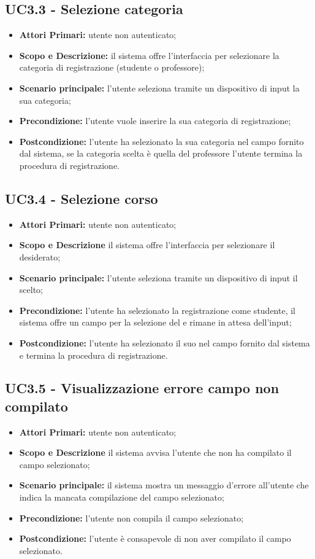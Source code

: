 \documentclass[AnalisiDeiRequisiti.tex]{subfiles}
\begin{document}
\subsection{UC3.3 - Selezione categoria}
\begin{itemize}
	\item \textbf{Attori Primari:} utente non autenticato;
	\item \textbf{Scopo e Descrizione:} il sistema offre l'interfaccia per selezionare la categoria di registrazione (studente o professore);
	\item \textbf{Scenario principale:} l'utente seleziona tramite un dispositivo di input la sua categoria;
	\item \textbf{Precondizione:} l'utente vuole inserire la sua categoria di registrazione;
	\item \textbf{Postcondizione:} l'utente ha selezionato la sua categoria nel campo fornito dal sistema, se la categoria scelta è quella del professore l'utente termina la procedura di registrazione.
\end{itemize}
\subsection{UC3.4 - Selezione corso}
\begin{itemize}
	\item \textbf{Attori Primari:} utente non autenticato;
	\item \textbf{Scopo e Descrizione} il sistema offre l'interfaccia per selezionare il  desiderato;
	\item \textbf{Scenario principale:} l'utente seleziona tramite un dispositivo di input il  scelto;
	\item \textbf{Precondizione:} l'utente ha selezionato la registrazione come studente, il sistema offre un campo per la selezione del  e rimane in attesa dell'input;
	\item \textbf{Postcondizione:} l'utente ha selezionato il suo  nel campo fornito dal sistema e termina la procedura di registrazione.
\end{itemize}

\subsection{UC3.5 - Visualizzazione errore campo non compilato}
\begin{itemize}
	\item \textbf{Attori Primari:} utente non autenticato;
	\item \textbf{Scopo e Descrizione} il sistema avvisa l'utente che non ha compilato il campo selezionato;
	\item \textbf{Scenario principale:} il sistema mostra un messaggio d'errore all'utente che indica la mancata compilazione del campo selezionato;
	\item \textbf{Precondizione:} l'utente non compila il campo selezionato;
	\item \textbf{Postcondizione:} l'utente è consapevole di non aver compilato il campo selezionato.
\end{itemize}
\end{document}

